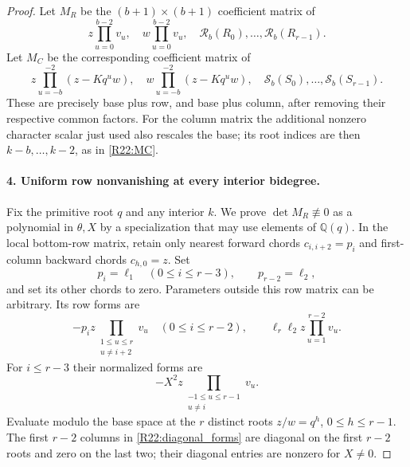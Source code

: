 \begin{proof}
Let $M_R$ be the $(b+1)\times(b+1)$ coefficient matrix of
\begin{equation}\label{R22:MR}
 z\prod_{u=0}^{b-2}v_u,\quad
 w\prod_{u=0}^{b-2}v_u,\quad
 \mathcal R_b(R_0),\ldots,\mathcal R_b(R_{r-1}).
\end{equation}
Let $M_C$ be the corresponding coefficient matrix of
\begin{equation}\label{R22:MC}
 z\prod_{u=-b}^{-2}(z-Kq^uw),\quad
 w\prod_{u=-b}^{-2}(z-Kq^uw),\quad
 \mathcal S_b(S_0),\ldots,\mathcal S_b(S_{r-1}).
\end{equation}
These are precisely base plus row, and base plus column, after
removing their respective common factors. For the column matrix the
additional nonzero character scalar just used also rescales the base;
its root indices are then $k-b,\ldots,k-2$, as in
\eqref{R22:MC}.

\paragraph{4. Uniform row nonvanishing at every interior bidegree.}
Fix the primitive root $q$ and any interior $k$. We prove
$\det M_R\not\equiv0$ as a polynomial in $\theta,X$ by a specialization
that may use elements of $\mathbb Q(q)$.
In the local bottom-row matrix, retain only nearest forward chords
$c_{i,i+2}=p_i$ and first-column backward chords $c_{h,0}=z$.
Set
\[
 p_i=\ell_1\quad(0\leq i\leq r-3),\qquad
 p_{r-2}=\ell_2,
\]
and set its other chords to zero. Parameters outside this row matrix
can be arbitrary. Its row forms are
\[
 -p_i z\prod_{\substack{1\leq u\leq r\\u\ne i+2}}v_u
 \quad(0\leq i\leq r-2),
 \qquad \ell_r\ell_2z\prod_{u=1}^{r-2}v_u.
\]
For $i\leq r-3$ their normalized forms are
\begin{equation}\label{R22:diagonal_forms}
 -X^2z\prod_{\substack{-1\leq u\leq r-1\\u\ne i}}v_u.
\end{equation}
Evaluate modulo the base space at the $r$ distinct roots
$z/w=q^h$, $0\leq h\leq r-1$. The first $r-2$ columns in
\eqref{R22:diagonal_forms} are diagonal on the first $r-2$ roots and
zero on the last two; their diagonal entries are nonzero for $X\ne0$.


\end{proof}
